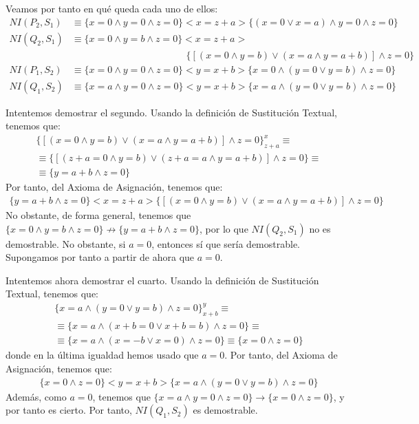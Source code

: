 \begin{ejercicio}
    Veamos por tanto en qué queda cada uno de ellos:
    \begin{align*}
        NI(P_2, S_1) & \equiv \{x=0 \land y=0 \land z=0\} <x=z+a> \{(x=0\lor x=a) \land y=0 \land z=0\} \\
        NI(Q_2, S_1) & \equiv \{x=0 \land y=b \land z=0\} <x=z+a>\\&\hspace{5cm} \{[(x=0\land y=b) \lor (x=a\land y=a+b)] \land z=0\} \\
        NI(P_1, S_2) & \equiv \{x=0 \land y=0 \land z=0\} <y=x+b> \{x=0 \land (y=0\lor y=b) \land z=0\} \\
        NI(Q_1, S_2) & \equiv \{x=a \land y=0 \land z=0\} <y=x+b> \{x=a \land (y=0\lor y=b) \land z=0\}
    \end{align*}

    Intentemos demostrar el segundo. Usando la definición de Sustitución Textual, tenemos que:
    \begin{multline*}
        \{[(x=0\land y=b) \lor (x=a\land y=a+b)] \land z=0\}_{z+a}^x \equiv \\ \equiv \{[(z+a=0\land y=b) \lor (z+a=a\land y=a+b)] \land z=0\} \equiv \\ \equiv \{y=a+b \land z=0\}
    \end{multline*}
    Por tanto, del Axioma de Asignación, tenemos que:
    \begin{multline*}
        \{y=a+b \land z=0\} <x=z+a> \{[(x=0\land y=b) \lor (x=a\land y=a+b)] \land z=0\}
    \end{multline*}
    No obstante, de forma general, tenemos que $\{x=0\land y=b\land z=0\}\not\rightarrow\{y=a+b \land z=0\}$, por lo que $NI(Q_2, S_1)$ no es demostrable. No obstante, si $a=0$, entonces sí que sería demostrable. Supongamos por tanto a partir de ahora que \ul{$a=0$}.

    Intentemos ahora demostrar el cuarto. Usando la definición de Sustitución Textual, tenemos que:
    \begin{multline*}
        \{x=a \land (y=0 \lor y=b) \land z = 0\}_{x+b}^y \equiv \\ \equiv \{x=a \land (x+b=0 \lor x+b=b) \land z = 0\} \equiv \\ \equiv \{x=a \land (x=-b\lor x=0) \land z = 0\} \equiv 
        \{x=0 \land z = 0\}
    \end{multline*}
    donde en la última igualdad hemos usado que \ul{$a=0$}. Por tanto, del Axioma de Asignación, tenemos que:
    \begin{multline*}
        \{x=0 \land z = 0\} <y=x+b> \{x=a \land (y=0 \lor y=b) \land z = 0\}
    \end{multline*}
    Además, como \ul{$a=0$}, tenemos que $\{x=a \land y=0 \land z=0\}\rightarrow\{x=0\land z=0\}$, y por tanto es cierto. Por tanto, $NI(Q_1, S_2)$ es demostrable.


\end{ejercicio}
